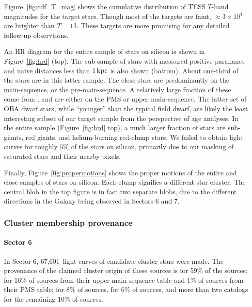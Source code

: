 \documentclass[12pt,twocolumn,tighten]{aastex62}
\newcommand{\sVInumberlcs}{67{,}601\ }  %
\begin{document}
Figure~\ref{fig:cdf_T_mag} shows the cumulative distribution of
TESS $T$-band magnitudes for the target stars.
Though most of the targets are faint, $\approx3\times10^4$ are
brighter than $T=13$. These targets are more promising for any
detailed follow-up observtions.

An HR diagram for the entire sample of stars on silicon
is shown in Figure~\ref{fig:hrd} (top).
The sub-sample of stars with
measured positive parallaxes and naive distances less than
$1\,{\rm kpc}$ is also shown (bottom).
About one-third of the stars are in this latter sample.
The close stars are predominantly on the main-sequence, or the pre-main-sequence.
A relatively large fraction of these come from \citet{zari_3d_2018},
and are either on the PMS or upper main-sequence.
The latter set of OBA dwarf stars, while ``younger'' than the typical
field dwarf, are likely the least interesting subset of our target sample
from the perspective of age analyses.
In the entire sample (Figure~\ref{fig:hrd} top), a much larger fraction of stars are sub-giants,
red giants, and helium-burning red-clump stars.
We failed to obtain light curves for roughly $5\%$ of the stars on silicon, 
primarily due to our masking of saturated stars and their nearby pixels.

Finally, 
Figure~\ref{fig:propermotions} shows the proper motions
of the entire and close samples of stars on silicon.
Each clump signifies a different star cluster. The central
blob in the top figure is in fact two separate blobs,
due to the different directions in the Galaxy being observed
in Sectors 6 and 7.



\subsubsection{Cluster membership provenance}

\paragraph{Sector 6}
In Sector 6, \sVInumberlcs light curves of candidate cluster stars
were made. The provenance of the claimed cluster origin of these
sources is \citet{dias_proper_2014} for 59\% of the sources;
\citet{zari_3d_2018} for 16\% of sources from their upper
main-sequence table and 1\% of sources from their PMS table;
\citet{Kharchenko_et_al_2013} for 8\% of sources,
\citet{cantat-gaudin_gaia_2018} for 6\% of sources, and more than two
catalogs for the remaining 10\% of sources.
\end{document}
